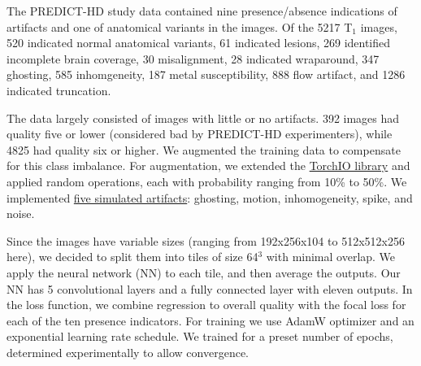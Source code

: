 \documentclass{midl} %
\begin{document}
The PREDICT-HD study data contained nine presence/absence indications of artifacts and one of anatomical variants in the images.
Of the 5217 T$_1$ images, 520 indicated normal anatomical variants, 61 indicated lesions, 269 identified incomplete brain coverage, 30 misalignment, 28 indicated wraparound, 347 ghosting, 585 inhomgeneity, 187 metal susceptibility, 888 flow artifact, and 1286 indicated truncation.

The data largely consisted of images with little or no artifacts. 392 images had quality five or lower (considered bad by PREDICT-HD experimenters), while 4825 had quality six or higher. We augmented the training data to compensate for this class imbalance. For augmentation, we extended the \href{https://torchio.readthedocs.io/transforms/augmentation.html}{TorchIO library} and applied random operations, each with probability ranging from 10\% to 50\%. We implemented \href{https://github.com/OpenImaging/miqa/pull/339}{five simulated artifacts}: ghosting, motion, inhomogeneity, spike, and noise.

Since the images have variable sizes (ranging from 192x256x104 to 512x512x256 here), we decided to split them into tiles of size 64$^3$ with minimal overlap. We apply the neural network (NN) to each tile, and then average the outputs. Our NN has 5 convolutional layers and a fully connected layer with eleven outputs. In the loss function, we combine regression to overall quality with the focal loss for each of the ten presence indicators. For training we use AdamW optimizer and an exponential learning rate schedule. We trained for a preset number of epochs, determined experimentally to allow convergence.
\end{document}

